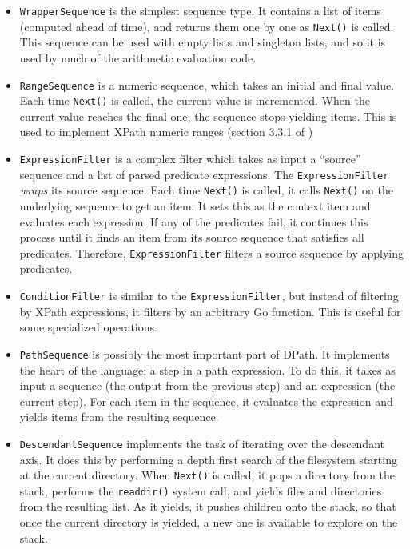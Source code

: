 \documentclass{article}
\begin{document}
\begin{itemize}
\item \texttt{WrapperSequence} is the simplest sequence type. It contains a list
  of items (computed ahead of time), and returns them one by one as
  \texttt{Next()} is called. This sequence can be used with empty lists and
  singleton lists, and so it is used by much of the arithmetic evaluation code.
\item \texttt{RangeSequence} is a numeric sequence, which takes an initial and
  final value. Each time \texttt{Next()} is called, the current value is
  incremented. When the current value reaches the final one, the sequence stops
  yielding items. This is used to implement XPath numeric ranges (section 3.3.1
  of \cite{xpath})
\item \texttt{ExpressionFilter} is a complex filter which takes as input a
  ``source'' sequence and a list of parsed predicate expressions. The
  \texttt{ExpressionFilter} \emph{wraps} its source sequence. Each time
  \texttt{Next()} is called, it calls \texttt{Next()} on the underlying sequence
  to get an item. It sets this as the context item and evaluates each
  expression. If any of the predicates fail, it continues this process until it
  finds an item from its source sequence that satisfies all predicates.
  Therefore, \texttt{ExpressionFilter} filters a source sequence by applying
  predicates.
\item \texttt{ConditionFilter} is similar to the \texttt{ExpressionFilter}, but
  instead of filtering by XPath expressions, it filters by an arbitrary Go
  function. This is useful for some specialized operations.
\item \texttt{PathSequence} is possibly the most important part of DPath. It
  implements the heart of the language: a step in a path expression. To do this,
  it takes as input a sequence (the output from the previous step) and an
  expression (the current step). For each item in the sequence, it evaluates the
  expression and yields items from the resulting sequence.
\item \texttt{DescendantSequence} implements the task of iterating over the
  descendant axis. It does this by performing a depth first search of the
  filesystem starting at the current directory. When \texttt{Next()} is called,
  it pops a directory from the stack, performs the \texttt{readdir()} system
  call, and yields files and directories from the resulting list. As it yields,
  it pushes children onto the stack, so that once the current directory is
  yielded, a new one is available to explore on the stack.
\end{itemize}
\end{document}
